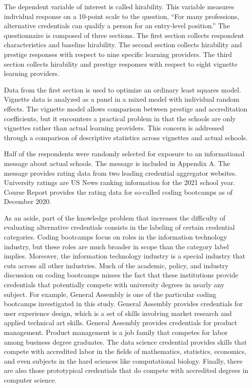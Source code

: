 \documentclass[review]{elsarticle}
\begin{document}
The dependent variable of interest is called hirability.
This variable measures individual response on a 10-point scale to the question,
``For many professions, alternative credentials can qualify a person for an entry-level position.''
The questionnaire is composed of three sections.
The first section collects respondent characteristics and baseline hirability.
The second section collects hirability and prestige responses with respect to nine specific learning providers.
The third section collects hirability and prestige responses with respect to eight vignette learning providers.

Data from the first section is used to optimize an ordinary least squares model.
Vignette data is analyzed as a panel in a mixed model with individual random effects.
The vignette model allows comparison between prestige and accreditation coefficients,
but it encounters a practical problem in that the schools are only vignettes rather than actual learning providers.
This concern is addressed through a comparison of descriptive statistics across vignettes and actual schools.

Half of the respondents were randomly selected for exposure to an informational message about actual schools.
The message is included in Appendix A.
The message provides rating data from two leading credential aggregator websites.
University ratings are US News ranking information for the 2021 school year.
Course Report provides the rating data for so-called coding bootcamps as of December 2020.

As an aside, part of the knowledge problem that increases the difficulty of evaluating alternative credentials consists in the labeling of certain credential categories.
Coding bootcamps focus on roles in the information technology industry, but these roles are much broader in scope than the category label implies.
Moreover, the information technology industry is a special industry that cuts across all other industries.
Much of the academic, policy, and industry discussion on coding bootcamps misses the fact that these institutions provide credentials that potentially compete with university degrees in nearly any subject.
For example, General Assembly is one of the particular coding bootcamps investigated in this study.
General Assembly provides credentials for user experience design, which is a set of skills involving market research and applied technical art skills.
General Assembly provides credentials for product management.
Product management is a job family that competes for labor among business degree graduates.
The data science credential provides skills that compete with accredited labor in the fields of mathematics, statistics, economics, and even subjects in the hard sciences like computational biology.
Finally, there are also those prototypical credentials that do compete with accredited degrees in computer science.
\end{document}
